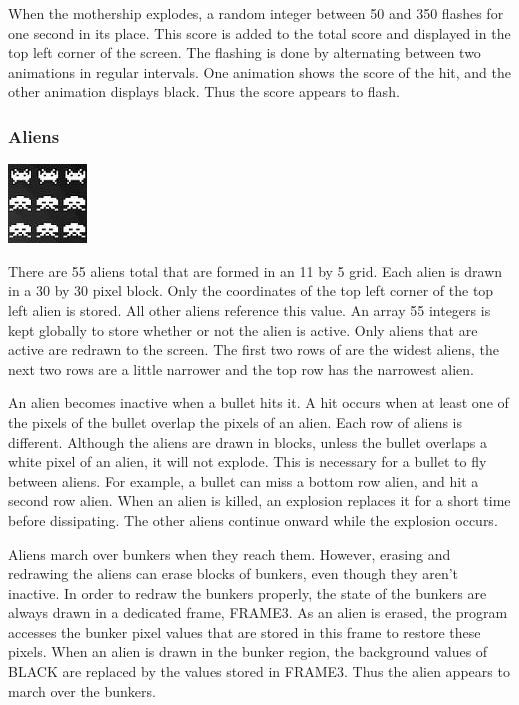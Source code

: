 \documentclass[11pt,letter,oneside]{report}
\begin{document}
When the mothership explodes, a random integer between 50 and 350 flashes for one second in its place. This score is added to the total score and displayed in the top left corner of the screen. The flashing is done by alternating between two animations in regular intervals. One animation shows the score of the hit, and the other animation displays black. Thus the score appears to flash.

\subsubsection{Aliens}
\includegraphics[]{aliens.jpg}

There are 55 aliens total that are formed in an 11 by 5 grid. Each alien is drawn in a 30 by 30 pixel block. Only the coordinates of the top left corner of the top left alien is stored. All other aliens reference this value. An array 55 integers is kept globally to store whether or not the alien is active. Only aliens that are active are redrawn to the screen. The first two rows of are the widest aliens, the next two rows are a little narrower and the top row has the narrowest alien.

An alien becomes inactive when a bullet hits it. A hit occurs when at least one of the pixels of the bullet overlap the pixels of an alien. Each row of aliens is different. Although the aliens are drawn in blocks, unless the bullet overlaps a white pixel of an alien, it will not explode. This is necessary for a bullet to fly between aliens. For example, a bullet can miss a bottom row alien, and hit a second row alien. When an alien is killed, an explosion replaces it for a short time before dissipating. The other aliens continue onward while the explosion occurs.

Aliens march over bunkers when they reach them. However, erasing and redrawing the aliens can erase blocks of bunkers, even though they aren't inactive. In order to redraw the bunkers properly, the state of the bunkers are always drawn in a dedicated frame, FRAME3.  As an alien is erased, the program accesses the bunker pixel values that are stored in this frame to restore these pixels. When an alien is drawn in the bunker region, the background values of BLACK are replaced by the values stored in FRAME3. Thus the alien appears to march over the bunkers.
\end{document}
